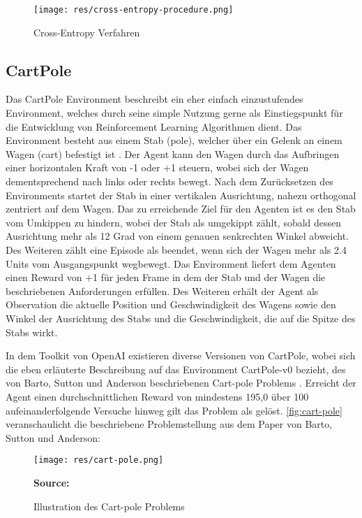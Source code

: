 \documentclass[11pt]{scrartcl}
\newcommand{\source}[1]{\vspace{-5pt} \caption*{\hfill \textbf{Source:} {#1}} }
\begin{document}
\begin{figure}[htp]
\centering
\texttt{[image: res/cross-entropy-procedure.png]}
\caption{Cross-Entropy Verfahren}
\label{fig:cross_entropy_procedure}
\end{figure}

\subsection{CartPole}
Das CartPole Environment beschreibt ein eher einfach einzustufendes Environment, welches durch seine
simple Nutzung gerne als Einstiegspunkt für die Entwicklung von Reinforcement Learning Algorithmen 
dient. Das Environment besteht aus einem Stab (pole), welcher über ein Gelenk an einem Wagen (cart) 
befestigt ist \cite{OAI2016_2}. Der Agent kann den Wagen durch das Aufbringen einer horizontalen Kraft 
von -1 oder +1 steuern, wobei sich der Wagen dementsprechend nach links oder rechts bewegt. Nach 
dem Zurücksetzen des Environments startet der Stab in einer vertikalen Ausrichtung, nahezu orthogonal
zentriert auf dem Wagen. Das zu erreichende Ziel für den Agenten ist es den Stab vom Umkippen zu hindern,
wobei der Stab als umgekippt zählt, sobald dessen Ausrichtung mehr als 12 Grad von einem genauen
senkrechten Winkel abweicht. Des Weiteren zählt eine Episode als beendet, wenn sich der Wagen mehr
als 2.4 Units vom Ausgangspunkt wegbewegt. Das Environment liefert dem Agenten einen Reward von +1
für jeden Frame in dem der Stab und der Wagen die beschriebenen Anforderungen erfüllen. Des Weiteren
erhält der Agent als Observation die aktuelle Position und Geschwindigkeit des Wagens sowie den Winkel
der Ausrichtung des Stabs und die Geschwindigkeit, die auf die Spitze des Stabs wirkt.

In dem Toolkit von OpenAI existieren diverse Versionen von CartPole, wobei sich die eben
erläuterte Beschreibung auf das Environment CartPole-v0 bezieht, des von Barto, Sutton und
Anderson beschriebenen Cart-pole Problems \cite[~S.838 f.]{BSA1983}. Erreicht der Agent einen
durchschnittlichen Reward von mindestens 195,0 über 100 aufeinanderfolgende Versuche hinweg gilt das
Problem als gelöst. \autoref{fig:cart-pole} veranschaulicht die beschriebene Problemstellung aus dem 
Paper\cite{BSA1983} von Barto, Sutton und Anderson:

\begin{figure}[htp]
\centering
\texttt{[image: res/cart-pole.png]}
\caption{Illustration des Cart-pole Problems}
\source{\cite[~S.838]{BSA1983}}
\label{fig:cart-pole}
\end{figure}
\end{document}
